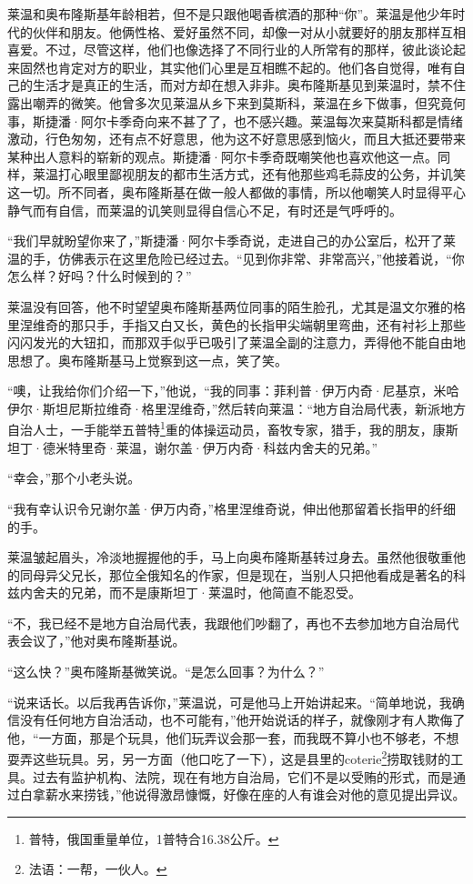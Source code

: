\par 莱温和奥布隆斯基年龄相若，但不是只跟他喝香槟酒的那种“你”。莱温是他少年时代的伙伴和朋友。他俩性格、爱好虽然不同，却像一对从小就要好的朋友那样互相喜爱。不过，尽管这样，他们也像选择了不同行业的人所常有的那样，彼此谈论起来固然也肯定对方的职业，其实他们心里是互相瞧不起的。他们各自觉得，唯有自己的生活才是真正的生活，而对方却在想入非非。奥布隆斯基见到莱温时，禁不住露出嘲弄的微笑。他曾多次见莱温从乡下来到莫斯科，莱温在乡下做事，但究竟何事，斯捷潘·阿尔卡季奇向来不甚了了，也不感兴趣。莱温每次来莫斯科都是情绪激动，行色匆匆，还有点不好意思，他为这不好意思感到恼火，而且大抵还要带来某种出人意料的崭新的观点。斯捷潘·阿尔卡季奇既嘲笑他也喜欢他这一点。同样，莱温打心眼里鄙视朋友的都市生活方式，还有他那些鸡毛蒜皮的公务，并讥笑这一切。所不同者，奥布隆斯基在做一般人都做的事情，所以他嘲笑人时显得平心静气而有自信，而莱温的讥笑则显得自信心不足，有时还是气呼呼的。
\par “我们早就盼望你来了，”斯捷潘·阿尔卡季奇说，走进自己的办公室后，松开了莱温的手，仿佛表示在这里危险已经过去。“见到你非常、非常高兴，”他接着说，“你怎么样？好吗？什么时候到的？”
\par 莱温没有回答，他不时望望奥布隆斯基两位同事的陌生脸孔，尤其是温文尔雅的格里涅维奇的那只手，手指又白又长，黄色的长指甲尖端朝里弯曲，还有衬衫上那些闪闪发光的大钮扣，而那双手似乎已吸引了莱温全副的注意力，弄得他不能自由地思想了。奥布隆斯基马上觉察到这一点，笑了笑。
\par “噢，让我给你们介绍一下，”他说，“我的同事：菲利普·伊万内奇·尼基京，米哈伊尔·斯坦尼斯拉维奇·格里涅维奇，”然后转向莱温：“地方自治局代表，新派地方自治人士，一手能举五普特\footnote{普特，俄国重量单位，1普特合16.38公斤。}重的体操运动员，畜牧专家，猎手，我的朋友，康斯坦丁·德米特里奇·莱温，谢尔盖·伊万内奇·科兹内舍夫的兄弟。”
\par “幸会，”那个小老头说。
\par “我有幸认识令兄谢尔盖·伊万内奇，”格里涅维奇说，伸出他那留着长指甲的纤细的手。
\par 莱温皱起眉头，冷淡地握握他的手，马上向奥布隆斯基转过身去。虽然他很敬重他的同母异父兄长，那位全俄知名的作家，但是现在，当别人只把他看成是著名的科兹内舍夫的兄弟，而不是康斯坦丁·莱温时，他简直不能忍受。
\par “不，我已经不是地方自治局代表，我跟他们吵翻了，再也不去参加地方自治局代表会议了，”他对奥布隆斯基说。
\par “这么快？”奥布隆斯基微笑说。“是怎么回事？为什么？”
\par “说来话长。以后我再告诉你，”莱温说，可是他马上开始讲起来。“简单地说，我确信没有任何地方自治活动，也不可能有，”他开始说话的样子，就像刚才有人欺侮了他，“一方面，那是个玩具，他们玩弄议会那一套，而我既不算小也不够老，不想耍弄这些玩具。另，另一方面（他口吃了一下），这是县里的coterie\footnote{法语：一帮，一伙人。}捞取钱财的工具。过去有监护机构、法院，现在有地方自治局，它们不是以受贿的形式，而是通过白拿薪水来捞钱，”他说得激昂慷慨，好像在座的人有谁会对他的意见提出异议。

